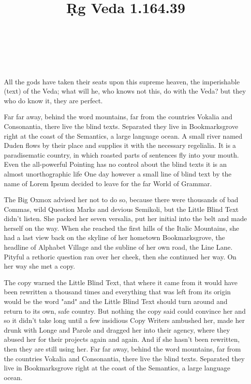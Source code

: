 \documentclass{xminimal}
\title{Ṛg Veda 1.164.39}
\author{\relax}
\date{\relax}
\begin{document}

\maketitle
\thispagestyle{empty}

 \danda \\
 \ddanda

 \danda \\
 \ddanda

All the gods have taken their seats upon this supreme heaven, the imperishable
(text) of the Veda; what will he, who knows not this, do with the Veda?
but they who do know it, they are perfect.

Far far away, behind the word mountains, far from the countries Vokalia and
Consonantia, there live the blind texts. Separated they live in Bookmarksgrove
right at the coast of the Semantics, a large language ocean. A small river
named Duden flows by their place and supplies it with the necessary regelialia.
It is a paradisematic country, in which roasted parts of sentences fly into
your mouth. Even the all-powerful Pointing has no control about the blind texts
it is an almost unorthographic life One day however a small line of blind text
by the name of Lorem Ipsum decided to leave for the far World of Grammar.

The Big Oxmox advised her not to do so, because there were thousands of bad
Commas, wild Question Marks and devious Semikoli, but the Little Blind Text
didn’t listen. She packed her seven versalia, put her initial into the belt
and made herself on the way. When she reached the first hills of the Italic
Mountains, she had a last view back on the skyline of her hometown
Bookmarksgrove, the headline of Alphabet Village and the subline of her own
road, the Line Lane. Pityful a rethoric question ran over her cheek, then she
continued her way. On her way she met a copy.

The copy warned the Little Blind Text, that where it came from it would have
been rewritten a thousand times and everything that was left from its origin
would be the word "and" and the Little Blind Text should turn around and return
to its own, safe country. But nothing the copy said could convince her and so
it didn’t take long until a few insidious Copy Writers ambushed her, made her
drunk with Longe and Parole and dragged her into their agency, where they abused
her for their projects again and again. And if she hasn’t been rewritten,
then they are still using her. Far far away, behind the word mountains,
far from the countries Vokalia and Consonantia, there live the blind texts.
Separated they live in Bookmarksgrove right at the coast of the Semantics,
a large language ocean.
\end{document}
